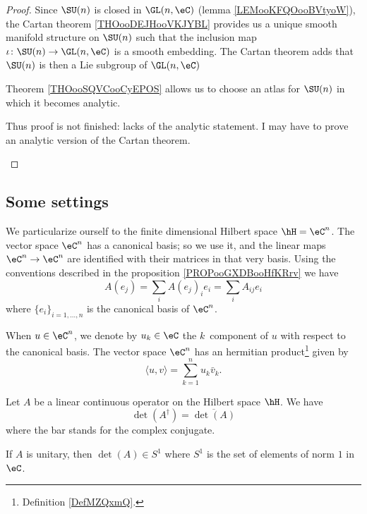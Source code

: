 \begin{proof}
    Since \( \SU(n)\) is closed in \( \GL(n,\eC)\) (lemma \ref{LEMooKFQOooBVtyoW}), the Cartan theorem \ref{THOooDEJHooVKJYBL} provides us a unique smooth manifold structure on \( \SU(n)\) such that the inclusion map \( \iota\colon \SU(n)\to \GL(n,\eC)\) is a smooth embedding. The Cartan theorem adds that \( \SU(n)\) is then a Lie subgroup of \( \GL(n,\eC)\)

    Theorem \ref{THOooSQVCooCyEPOS} allows us to choose an atlas for \( \SU(n)\) in which it becomes analytic.
    \begin{probleme}
        Thus proof is not finished: lacks of the analytic statement. I may have to prove an analytic version of the Cartan theorem.
    \end{probleme}
\end{proof}

\subsection{Some settings}

We particularize ourself to the finite dimensional Hilbert space \( \hH=\eC^n\). The vector space \( \eC^n\) has a canonical basis; so we use it, and the linear maps \( \eC^n\to \eC^n\) are identified with their matrices in that very basis. Using the conventions described in the proposition \ref{PROPooGXDBooHfKRrv} we have 
\begin{equation}
    A(e_j)=\sum_iA(e_j)_ie_i=\sum_iA_{ij}e_i
\end{equation}
where \( \{ e_i \}_{i=1,\ldots, n}\) is the canonical basis of \( \eC^n\).

When \( u\in \eC^n\), we denote by \( u_k\in \eC\) the \( k\)\ieme\ component of \( u\) with respect to the canonical basis. The vector space \( \eC^n\) has an hermitian product\footnote{Definition \ref{DefMZQxmQ}.} given by
\begin{equation}
    \langle u, v\rangle =\sum_{k=1}^nu_k\bar v_k.
\end{equation}

\begin{lemma}       \label{LEMooKEUZooUjQVmp}
    Let \( A\) be a linear continuous operator on the Hilbert space \( \hH\). We have
    \begin{equation}
        \det(A^{\dag})=\overline{ \det(A) }
    \end{equation}
    where the bar stands for the complex conjugate.

    If \( A\) is unitary, then \( \det(A)\in S^1\) where \( S^1\) is the set of elements of norm \( 1\) in \( \eC\).
\end{lemma}

